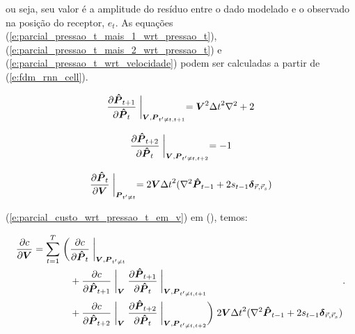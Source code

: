   \noindent ou seja, seu valor é a amplitude do resíduo entre o dado modelado e o observado na posição do receptor, $e_t$. As equações (\ref{e:parcial_pressao_t_mais_1_wrt_pressao_t}), (\ref{e:parcial_pressao_t_mais_2_wrt_pressao_t}) e (\ref{e:parcial_pressao_t_wrt_velocidade}) podem ser calculadas a partir de (\ref{e:fdm_rnn_cell}).


  \begin{equation} \label{e:parcial_pressao_t_mais_1_wrt_pressao_t}
    \frac{\partial \boldsymbol{\hat{P}}_{t+1}}{\partial \boldsymbol{\hat{P}}_t} \biggm\lvert_{\boldsymbol{V}, \boldsymbol{P}_{t'\ne t, t+1}} =
    \boldsymbol{V}^2 {\Delta t}^2 \nabla^2 + 2
  \end{equation}

  \begin{equation} \label{e:parcial_pressao_t_mais_2_wrt_pressao_t}
    \frac{\partial \boldsymbol{\hat{P}}_{t+2}}{\partial \boldsymbol{\hat{P}}_t} \biggm\lvert_{\boldsymbol{V}, \boldsymbol{P}_{t'\ne t, t+2}} =
    -1
  \end{equation}

  \begin{equation} \label{e:parcial_pressao_t_wrt_velocidade}
    \frac{\partial \boldsymbol{\hat{P}}_{t}}{\partial \boldsymbol{V}} \biggm\lvert_{\boldsymbol{P}_{t'\ne t}} =
    2 \boldsymbol{V} {\Delta t}^2 (\nabla^2 \boldsymbol{\hat{P}}_{t-1} + 2 s_{t-1} \boldsymbol{\delta}_{\vec{r}, \vec{r}_s})
  \end{equation}

  \DIFdelbegin {}\DIFdelend \DIFaddbegin {}\DIFaddend (\ref{e:parcial_custo_wrt_pressao_t_em_v}) em (\DIFdelbegin \DIFdel{\ref{e:parcial_custo_wrt_pressao_t_em_v}}\DIFdelend \DIFaddbegin \DIFadd{\ref{e:parcial_custo_wrt_velocidade}}\DIFaddend ), temos:

  \begin{equation} \label{e:parcial_custo_wrt_velocidade_subs_1}
    \begin{split}
      \frac{\partial c}{\partial \boldsymbol{V}} =
        \sum \limits_{t=1}^T \biggm( &
          \frac{\partial c}{\partial \boldsymbol{\hat{P}}_t} \biggm\lvert_{\boldsymbol{V}, \boldsymbol{P}_{t'\ne t}} \\
        & + \frac{\partial c}{\partial \boldsymbol{\hat{P}}_{t+1}} \biggm\lvert_{\boldsymbol{V}}
                \frac{\partial \boldsymbol{\hat{P}}_{t+1}}{\partial \boldsymbol{\hat{P}}_{t}} \biggm\lvert_{\boldsymbol{V}, \boldsymbol{P}_{t'\ne t, t+1}} \\
        & + \frac{\partial c}{\partial \boldsymbol{\hat{P}}_{t+2}} \biggm\lvert_{\boldsymbol{V}}
                \frac{\partial \boldsymbol{\hat{P}}_{t+2}}{\partial \boldsymbol{\hat{P}}_{t}} \biggm\lvert_{\boldsymbol{V}, \boldsymbol{P}_{t'\ne t, t+2}}
        \biggm)
        2 \boldsymbol{V} {\Delta t}^2 (\nabla^2 \boldsymbol{\hat{P}}_{t-1} + 2 s_{t-1} \boldsymbol{\delta}_{\vec{r}, \vec{r}_s})
    \end{split}
    .
  \end{equation}

